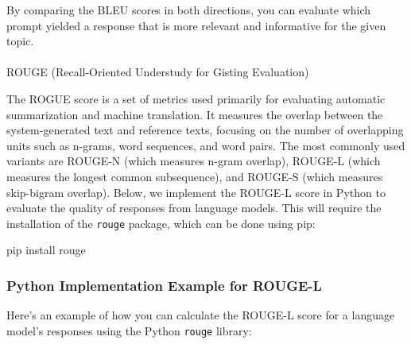 \documentclass[
]{agujournal2019}
\makeatletter
\let\oldparagraph\paragraph
\renewcommand{\paragraph}{
    \@ifstar
      \xxxParagraphStar
      \xxxParagraphNoStar
  }
\newcommand{\xxxParagraphStar}[1]{\oldparagraph*{#1}\mbox{}}
\newcommand{\xxxParagraphNoStar}[1]{\oldparagraph{#1}\mbox{}}
\newenvironment{Shaded}{\begin{snugshade}}{\end{snugshade}}
\newcommand{\ExtensionTok}[1]{\textcolor[rgb]{0.00,0.23,0.31}{#1}}
\newcommand{\NormalTok}[1]{\textcolor[rgb]{0.00,0.23,0.31}{#1}}
\makeatother
\begin{document}
By comparing the BLEU scores in both directions, you can evaluate which
prompt yielded a response that is more relevant and informative for the
given topic.

\paragraph{ROUGE (Recall-Oriented Understudy for Gisting
Evaluation)}\label{rouge-recall-oriented-understudy-for-gisting-evaluation}

The ROGUE score is a set of metrics used primarily for evaluating
automatic summarization and machine translation. It measures the overlap
between the system-generated text and reference texts, focusing on the
number of overlapping units such as n-grams, word sequences, and word
pairs. The most commonly used variants are ROUGE-N (which measures
n-gram overlap), ROUGE-L (which measures the longest common
subsequence), and ROUGE-S (which measures skip-bigram overlap). Below,
we implement the ROUGE-L score in Python to evaluate the quality of
responses from language models. This will require the installation of
the \texttt{rouge} package, which can be done using pip:

\begin{Shaded}
\begin{Highlighting}[]
\ExtensionTok{pip}\NormalTok{ install rouge}
\end{Highlighting}
\end{Shaded}

\subsubsection{Python Implementation Example for
ROUGE-L}\label{python-implementation-example-for-rouge-l}

Here's an example of how you can calculate the ROUGE-L score for a
language model's responses using the Python \texttt{rouge} library:
\end{document}
